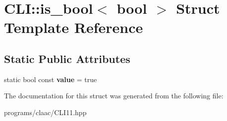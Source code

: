 \hypertarget{struct_c_l_i_1_1is__bool_3_01bool_01_4}{}\section{C\+LI\+:\+:is\+\_\+bool$<$ bool $>$ Struct Template Reference}
\label{struct_c_l_i_1_1is__bool_3_01bool_01_4}
\subsection*{Static Public Attributes}
\begin{DoxyCompactItemize}
\item 
\mbox{\label{struct_c_l_i_1_1is__bool_3_01bool_01_4_a54d8224c914b3935d8e827c7f1775a8e}} 
static bool const {\bfseries value} = true
\end{DoxyCompactItemize}


The documentation for this struct was generated from the following file\+:\begin{DoxyCompactItemize}
\item 
programs/claac/C\+L\+I11.\+hpp\end{DoxyCompactItemize}
